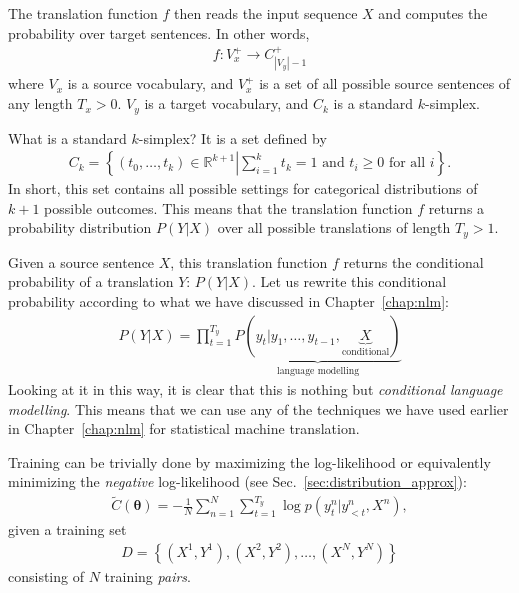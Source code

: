 \documentclass{report}
\newcommand{\vects}[1]{\boldsymbol{#1}}
\newcommand{\TT}[0]{\vects{\theta}}
\newcommand{\RR}[0]{\mathbb{R}}
\begin{document}
The translation function $f$ then reads the input sequence $X$ and computes the
probability over target sentences. In other words,
\begin{align}
    \label{eq:translation_f}
    f: V_x^+ \to C_{|V_y|-1}^+
\end{align}
where $V_x$ is a source vocabulary, and $V_x^+$ is a set of all possible source
sentences of any length $T_x>0$. $V_y$ is a target vocabulary, and $C_k$ is a
standard $k$-simplex. 

What is a standard $k$-simplex? It is a set defined by
\begin{align*}
    C_k = \left\{ 
        (t_0, \ldots, t_k) \in \RR^{k+1} 
        \left|
        \sum_{i=1}^k t_k = 1 
        \text{ and }
        t_i \geq 0 \text{ for all } i
        \right.
    \right\}.
\end{align*}
In short, this set contains all possible settings for categorical distributions
of $k+1$ possible outcomes. This means that the translation function $f$ returns
a probability distribution $P(Y|X)$ over all possible translations of length
$T_y>1$. 

Given a source sentence $X$, this translation function $f$ returns the
conditional probability of a translation $Y$: $P(Y | X)$. Let us rewrite this
conditional probability according to what we have discussed in
Chapter~\ref{chap:nlm}:
\begin{align}
    \label{eq:condlm}
    P(Y | X) = \prod_{t=1}^{T_y} 
    \underbrace{P(y_t | y_{1}, \ldots, y_{t-1},
        \underbrace{X}_{\text{conditional}}
)}_{\text{language modelling}}
\end{align}
Looking at it in this way, it is clear that this is nothing but {\em conditional
language modelling}.  This means that we can use any of the techniques we have
used earlier in Chapter~\ref{chap:nlm} for statistical machine translation.

Training can be trivially done by maximizing the log-likelihood or equivalently
minimizing the {\em negative} log-likelihood (see
Sec.~\ref{sec:distribution_approx}):
\begin{align}
    \label{eq:nmt_cost}
    \tilde{C}(\TT) = -\frac{1}{N} \sum_{n=1}^N \sum_{t=1}^{T_y} \log p(y^n_t |
    y^n_{<t}, X^n),
\end{align}
given a training set 
\begin{align}
    \label{eq:data}
    D = \left\{ (X^1, Y^1), (X^2, Y^2), \ldots, (X^N, Y^N)\right\}
\end{align}
consisting of $N$ training {\em pairs}.
\end{document}

